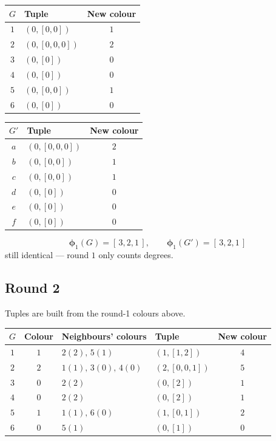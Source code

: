 \documentclass[11pt]{article}
\begin{document}
\begin{center}
\begin{tabular}{c l c}
\toprule
\rowcolor{white}
$G$ & Tuple & New colour \\
\midrule
$1$ & $(0,[0,0])$   & $1$ \\
$2$ & $(0,[0,0,0])$ & $2$ \\
$3$ & $(0,[0])$     & $0$ \\
$4$ & $(0,[0])$     & $0$ \\
$5$ & $(0,[0,0])$   & $1$ \\
$6$ & $(0,[0])$     & $0$ \\
\bottomrule
\end{tabular}
\qquad
{}
\begin{tabular}{c l c}
\toprule
\rowcolor{white}
$G'$ & Tuple & New colour \\
\midrule
$a$ & $(0,[0,0,0])$ & $2$ \\
$b$ & $(0,[0,0])$   & $1$ \\
$c$ & $(0,[0,0])$   & $1$ \\
$d$ & $(0,[0])$     & $0$ \\
$e$ & $(0,[0])$     & $0$ \\
$f$ & $(0,[0])$     & $0$ \\
\bottomrule
\end{tabular}
\end{center}

\[
  \boldsymbol{\phi}_1(G)=[\,3,2,1\,],\qquad \boldsymbol{\phi}_1(G')=[\,3,2,1\,]
\]
still identical --- round $1$ only counts degrees.

\subsection*{Round 2}

Tuples are built from the round-1 colours above.

\begin{center}
\begin{tabular}{c c l l c}
\toprule
\rowcolor{white}
$G$ & Colour & Neighbours' colours & Tuple & New colour \\
\midrule
$1$ & $1$ & $2(2),\,5(1)$          & $(1,[1,2])$   & $4$ \\
$2$ & $2$ & $1(1),\,3(0),\,4(0)$   & $(2,[0,0,1])$ & $5$ \\
$3$ & $0$ & $2(2)$                 & $(0,[2])$     & $1$ \\
$4$ & $0$ & $2(2)$                 & $(0,[2])$     & $1$ \\
$5$ & $1$ & $1(1),\,6(0)$          & $(1,[0,1])$   & $2$ \\
$6$ & $0$ & $5(1)$                 & $(0,[1])$     & $0$ \\
\bottomrule
\end{tabular}
\end{center}
\end{document}
